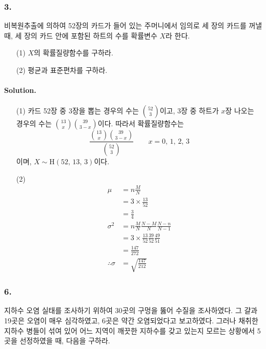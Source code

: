 \subsubsection{3.} 비복원추출에 의하여 52장의 카드가 들어 있는 주머니에서 임의로 세 장의 카드를 꺼낼 때, 세 장의 카드 안에 포함된 하트의 수를 확률변수 $X$라 한다.

\begin{itemize}
	\item [(1)] $X$의 확률질량함수를 구하라.
    \item [(2)] 평균과 표준편차를 구하라.
\end{itemize}

\paragraph{Solution.}
\begin{itemize}
    \item [(1)] {
        카드 52장 중 3장을 뽑는 경우의 수는 $\displaystyle \binom{52}{3}$이고,
        3장 중 하트가 $x$장 나오는 경우의 수는 $\displaystyle \binom{13}{x}\binom{39}{3 - x}$이다. 따라서 확률질량함수는
        \[\frac{\displaystyle\binom{13}{x}\binom{39}{3 - x}}{\displaystyle\binom{52}{3}} \qquad x=0,\,1,\,2,\,3\]
        이며, $X \sim \mathrm{H}\left(52,\,13,\,3\right)$이다.
    }
    \item [(2)] {
            \begin{align*}
                \mu &= n\frac{M}{N}\\
                &= 3\times\frac{13}{52}\\
                &= \frac{3}{4}\\
                \sigma^2 &= n\frac{M}{N}\frac{N-M}{N}\frac{N-n}{N-1}\\
                &= 3\times\frac{13}{52}\frac{39}{52}\frac{49}{51}\\
                &= \frac{147}{272}\\
                \therefore \sigma &= \sqrt{\frac{147}{212}}
            \end{align*}
    }
\end{itemize}

\subsubsection{6.} 지하수 오염 실태를 조사하기 위하여 30곳의 구멍을 뚫어 수질을 조사하였다. 그 걀과 19곳은 오염이 매우 심각하였고, 6곳은 약간 오염되었다고 보고하였다. 그러나
채취한 지하수 병들이 섞여 있어 어느 지역이 깨끗한 지하수를 갖고 있는지 모르는 상황에서 5곳을 선정하였을 때, 다음을 구하라.


